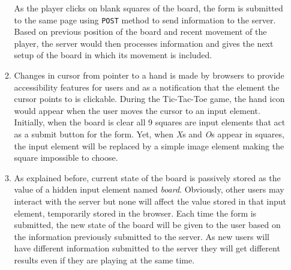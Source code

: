 \begin{enumerate}[label=(\alph*)]
\begin{enumerate}[label=(\roman*)]
As the player clicks on blank squares of the board, the form is submitted to the same page using \texttt{POST} method to send information to the server.
Based on previous position of the board and recent movement of the player, the server would then processes information and gives the next setup of the board in which its movement is included.

\item
Changes in cursor from pointer to a hand is made by browsers to provide accessibility features for users and as a notification that the element the cursor points to is clickable.
During the Tic-Tac-Toe game, the hand icon would appear when the user moves the cursor to an input element.
Initially, when the board is clear all 9 squares are input elements that act as a submit button for the form.
Yet, when \textit{X}s and \textit{O}s appear in squares, the input element will be replaced by a simple image element making the square impossible to choose.

\item
As explained before, current state of the board is passively stored as the value of a hidden input element named \textit{board}.
Obviously, other users may interact with the server but none will affect the value stored in that input element, temporarily stored in the browser.
Each time the form is submitted, the new state of the board will be given to the user based on the information previously submitted to the server.
As new users will have different information submitted to the server they will get different results even if they are playing at the same time.

\end{enumerate}

\end{enumerate}

